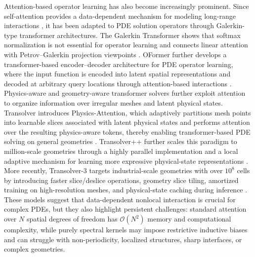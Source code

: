 \documentclass{article}
\begin{document}
Attention-based operator learning has also become increasingly prominent. Since self-attention provides a data-dependent mechanism for modeling long-range interactions \cite{vaswani2017attention}, it has been adapted to PDE solution operators through Galerkin-type transformer architectures. The Galerkin Transformer shows that softmax normalization is not essential for operator learning and connects linear attention with Petrov--Galerkin projection viewpoints \cite{cao2021galerkin}. OFormer further develops a transformer-based encoder--decoder architecture for PDE operator learning, where the input function is encoded into latent spatial representations and decoded at arbitrary query locations through attention-based interactions \cite{li2023oformer}.
Physics-aware and geometry-aware transformer solvers further exploit attention to organize information over irregular meshes and latent physical states. Transolver introduces Physics-Attention, which adaptively partitions mesh points into learnable slices associated with latent physical states and performs attention over the resulting physics-aware tokens, thereby enabling transformer-based PDE solving on general geometries
\cite{wu2024transolver}. Transolver++ further scales this paradigm to million-scale geometries through a highly parallel implementation and a local adaptive mechanism for learning more expressive physical-state representations \cite{luo2025transolverpp}. More recently, Transolver-3 targets industrial-scale geometries with over $10^8$ cells by introducing faster slice/deslice operations, geometry slice tiling, amortized training on high-resolution meshes,
and physical-state caching during inference \cite{zhou2026transolver3}.
These models suggest that data-dependent nonlocal interaction is crucial for complex PDEs, but they also highlight persistent challenges: standard attention over $N$ spatial degrees of freedom has $\mathcal{O}(N^2)$ memory and computational complexity, while purely spectral kernels may impose restrictive inductive biases and can struggle with non-periodicity, localized structures, sharp interfaces, or complex geometries.
\end{document}
